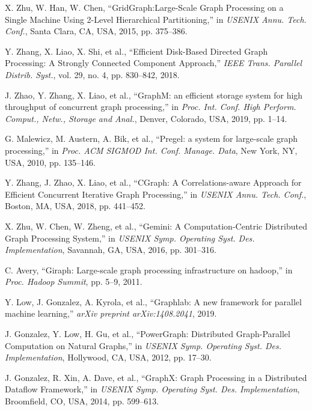 \documentclass[lettersize,journal]{IEEEtran} %
\begin{document}
\begin{thebibliography}{100}
  X. Zhu, W. Han, W. Chen, ``{GridGraph}:{Large-Scale} Graph Processing on a Single Machine Using 2-Level Hierarchical Partitioning,'' in \textit{USENIX Annu. Tech. Conf.}, Santa Clara, CA, USA, 2015, pp. 375--386.
  
  Y. Zhang, X. Liao, X. Shi, et al., ``Efficient Disk-Based Directed Graph Processing: A Strongly Connected Component Approach,'' \textit{IEEE Trans. Parallel Distrib. Syst.}, vol. 29, no. 4, pp. 830--842, 2018.
  
  J. Zhao, Y. Zhang, X. Liao, et al., ``GraphM: an efficient storage system for high throughput of concurrent graph processing,'' in \textit{Proc. Int. Conf. High Perform. Comput., Netw., Storage and Anal.}, Denver, Colorado, USA, 2019, pp. 1--14.
  
  G. Malewicz, M. Austern, A. Bik, et al., ``Pregel: a system for large-scale graph processing,'' in \textit{Proc. ACM SIGMOD Int. Conf. Manage. Data}, New York, NY, USA, 2010, pp. 135--146.
  
  Y. Zhang, J. Zhao, X. Liao, et al., ``{CGraph}: A Correlations-aware Approach for Efficient Concurrent Iterative Graph Processing,'' in \textit{USENIX Annu. Tech. Conf.}, Boston, MA, USA, 2018, pp. 441--452.

  X. Zhu, W. Chen, W. Zheng, et al., ``Gemini: A {Computation-Centric} Distributed Graph Processing System,'' in \textit{USENIX Symp. Operating Syst. Des. Implementation}, Savannah, GA, USA, 2016, pp. 301--316.
  
  C. Avery, ``Giraph: Large-scale graph processing infrastructure on hadoop,'' in \textit{Proc. Hadoop Summit}, pp. 5--9, 2011.
  
  Y. Low, J. Gonzalez, A. Kyrola, et al., ``Graphlab: A new framework for parallel machine learning,'' \textit{arXiv preprint arXiv:1408.2041}, 2019.
  
  J. Gonzalez, Y. Low, H. Gu, et al., ``{PowerGraph}: Distributed {Graph-Parallel} Computation on Natural Graphs,'' in \textit{USENIX Symp. Operating Syst. Des. Implementation}, Hollywood, CA, USA, 2012, pp. 17--30.
  
  J. Gonzalez, R. Xin, A. Dave, et al., ``{GraphX}: Graph Processing in a Distributed Dataflow Framework,'' in \textit{USENIX Symp. Operating Syst. Des. Implementation}, Broomfield, CO, USA, 2014, pp. 599--613.
  

\end{thebibliography}
\end{document}

